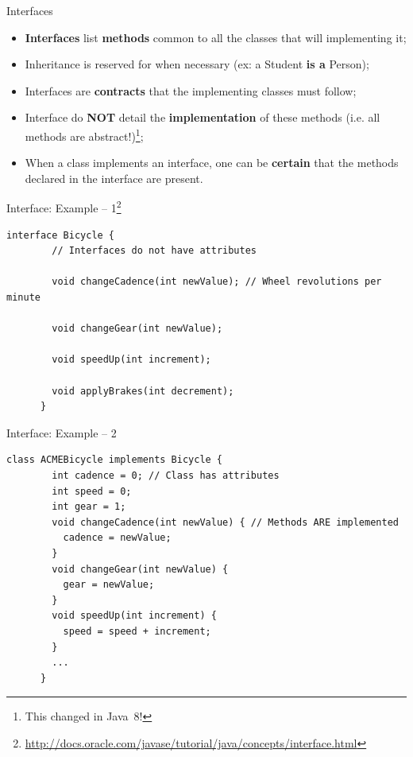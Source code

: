 \documentclass[English,c,%
hyperref={%
  pdftitle={Java Inheritance/Interfaces},%
  pdfauthor={Muller, Gravier, Laforest, Subercaze},%
  pdfsubject={Java Inheritance/Interfaces},%
  pdfkeywords={Inheritance, Interface, Java},%
  colorlinks=true,%
  urlcolor=blue,%
  linkcolor=%
},%
xcolor={pdftex,svgnames} %
]{beamer}
\begin{document}
  \begin{frame}{Interfaces}
    \begin{itemize}
      \item \textbf{Interfaces} list \textbf{methods} common to all the classes that will implementing it;
      \item Inheritance is reserved for when necessary (ex: a Student \textbf{is a} Person);
      \item Interfaces are \textbf{contracts} that the implementing classes must follow;
      \item Interface do \textbf{NOT} detail the \textbf{implementation} of these methods (i.e. all methods are abstract!)\footnote{This changed in Java~8!};
      \item When a class implements an interface, one can be \textbf{certain} that the methods declared in the interface are present.
    \end{itemize}
  \end{frame}




  \begin{frame}[fragile]{Interface: Example -- 1\footnote{\url{http://docs.oracle.com/javase/tutorial/java/concepts/interface.html}}}
    \vspace{-1em}
    \begin{lstlisting}[escapechar=\%,label=intex,caption=Bicycle.java,basicstyle=\footnotesize]
      interface Bicycle {
        // Interfaces do not have attributes

        void changeCadence(int newValue); // Wheel revolutions per minute

        void changeGear(int newValue);

        void speedUp(int increment);

        void applyBrakes(int decrement);
      }
    \end{lstlisting}

  \end{frame}


  \begin{frame}[fragile]{Interface: Example -- 2}
    \vspace{-1.2em}
    \begin{lstlisting}[escapechar=\%,label=intex,caption=ACMEBicycle.java,basicstyle=\footnotesize]
      class ACMEBicycle implements Bicycle {
        int cadence = 0; // Class has attributes
        int speed = 0;
        int gear = 1;
        void changeCadence(int newValue) { // Methods ARE implemented
          cadence = newValue;
        }
        void changeGear(int newValue) {
          gear = newValue;
        }
        void speedUp(int increment) {
          speed = speed + increment;
        }
        ...
      }
    \end{lstlisting}
  \end{frame}
\end{document}
